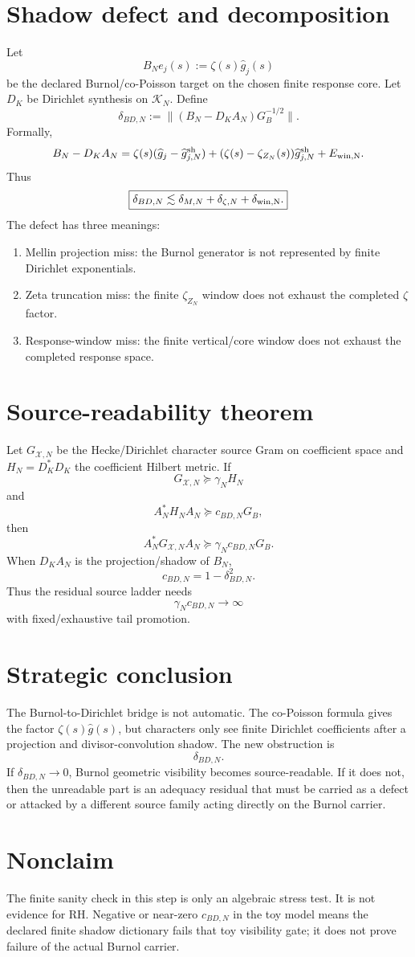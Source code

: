 \documentclass[11pt]{article}
\begin{document}
\section{Shadow defect and decomposition}
Let
\[
  B_Ne_j(s):=\zeta(s)\widehat g_j(s)
\]
be the declared Burnol/co-Poisson target on the chosen finite response core. Let $D_K$ be Dirichlet synthesis on $\mathcal K_N$. Define
\[
  \boxed{
  \delta_{BD,N}:=\|(B_N-D_KA_N)G_B^{-1/2}\|.
  }
\]
Formally,
\[
  B_N-D_KA_N
  =\zeta(s)(\widehat g_j-\widehat g^{\rm sh}_{j,N})
  +(\zeta(s)-\zeta_{Z_N}(s))\widehat g^{\rm sh}_{j,N}
  +E_{\rm win,N}.
\]
Thus
\[
  \boxed{
  \delta_{BD,N}\lesssim
  \delta_{M,N}+\delta_{\zeta,N}+\delta_{\rm win,N}.
  }
\]
The defect has three meanings:
\begin{enumerate}[nosep]
\item Mellin projection miss: the Burnol generator is not represented by finite Dirichlet exponentials.
\item Zeta truncation miss: the finite $\zeta_{Z_N}$ window does not exhaust the completed $\zeta$ factor.
\item Response-window miss: the finite vertical/core window does not exhaust the completed response space.
\end{enumerate}

\section{Source-readability theorem}
Let $G_{\mathcal X,N}$ be the Hecke/Dirichlet character source Gram on coefficient space and $H_N=D_K^*D_K$ the coefficient Hilbert metric. If
\[
  G_{\mathcal X,N}\succeq \gamma_NH_N
\]
and
\[
  A_N^*H_NA_N\succeq c_{BD,N}G_B,
\]
then
\[
  A_N^*G_{\mathcal X,N}A_N\succeq \gamma_Nc_{BD,N}G_B.
\]
When $D_KA_N$ is the projection/shadow of $B_N$,
\[
  c_{BD,N}=1-\delta_{BD,N}^2.
\]
Thus the residual source ladder needs
\[
  \boxed{\gamma_Nc_{BD,N}\to\infty}
\]
with fixed/exhaustive tail promotion.

\section{Strategic conclusion}
The Burnol-to-Dirichlet bridge is not automatic. The co-Poisson formula gives the factor $\zeta(s)\widehat g(s)$, but characters only see finite Dirichlet coefficients after a projection and divisor-convolution shadow. The new obstruction is
\[
  \boxed{\delta_{BD,N}.}
\]
If $\delta_{BD,N}\to0$, Burnol geometric visibility becomes source-readable. If it does not, then the unreadable part is an adequacy residual that must be carried as a defect or attacked by a different source family acting directly on the Burnol carrier.

\section{Nonclaim}
The finite sanity check in this step is only an algebraic stress test. It is not evidence for RH. Negative or near-zero $c_{BD,N}$ in the toy model means the declared finite shadow dictionary fails that toy visibility gate; it does not prove failure of the actual Burnol carrier.
\end{document}
